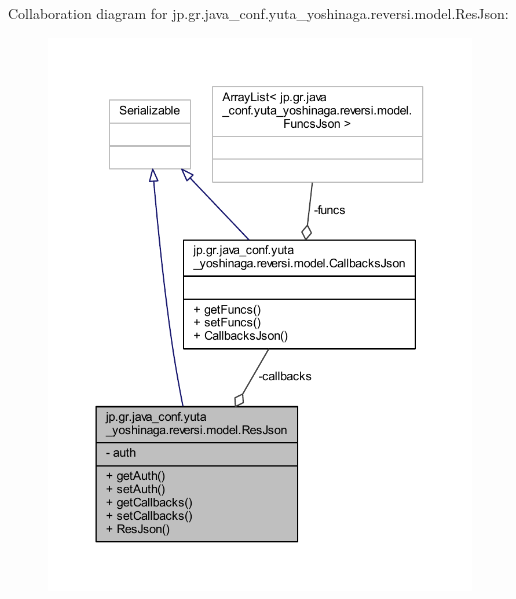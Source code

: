 Collaboration diagram for jp.\+gr.\+java\+\_\+conf.\+yuta\+\_\+yoshinaga.\+reversi.\+model.\+Res\+Json\+:
\nopagebreak
\begin{figure}[H]
\begin{center}
\leavevmode
\includegraphics[width=350pt]{classjp_1_1gr_1_1java__conf_1_1yuta__yoshinaga_1_1reversi_1_1model_1_1_res_json__coll__graph}
\end{center}
\end{figure}
